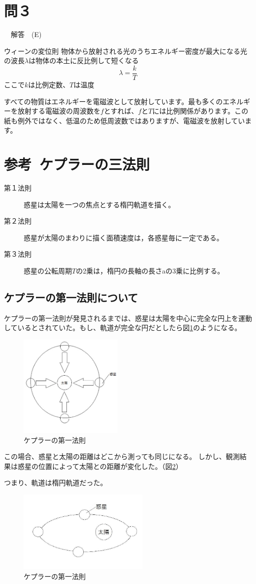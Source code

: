 \section*{問３}
　解答　(E) \par
ウィーンの変位則
物体から放射される光のうちエネルギー密度が最大になる光の波長$\lambda$は物体の本土に反比例して短くなる
\[
\lambda = \frac{k}{T}
\]
ここで$k$は比例定数、$T$は温度

すべての物質はエネルギーを電磁波として放射しています。最も多くのエネルギーを放射する電磁波の周波数を$f$とすれば、$f$と$T$には比例関係があります。この紙も例外ではなく、低温のため低周波数ではありますが、電磁波を放射しています。

\newpage
\section*{参考\ ケプラーの三法則}
\begin{description}
\item[第１法則] 惑星は太陽を一つの焦点とする楕円軌道を描く。
\item[第２法則] 惑星が太陽のまわりに描く面積速度は，各惑星毎に一定である。
\item[第３法則] 惑星の公転周期$T$の2乗は，楕円の長軸の長さaの3乗に比例する。
\end{description}
\subsection*{ケプラーの第一法則について}
ケプラーの第一法則が発見されるまでは、惑星は太陽を中心に完全な円上を運動しているとされていた。もし、軌道が完全な円だとしたら図\ref{fig:kep1}のようになる。
\begin{figure}[H]
  \centering
  \includegraphics[height=5cm,clip]{nishimura/image/kep1.jpg}
  \caption{ケプラーの第一法則}
  \label{fig:kep1}
\end{figure}
この場合、惑星と太陽の距離はどこから測っても同じになる。
しかし、観測結果は惑星の位置によって太陽との距離が変化した。（図\ref{fig:kep1_1}）\par
つまり、軌道は楕円軌道だった。
\begin{figure}[H]
  \centering
  \includegraphics[height=4cm,clip]{nishimura/image/kep1_1.jpg}
  \caption{ケプラーの第一法則}
  \label{fig:kep1_1}
\end{figure}

